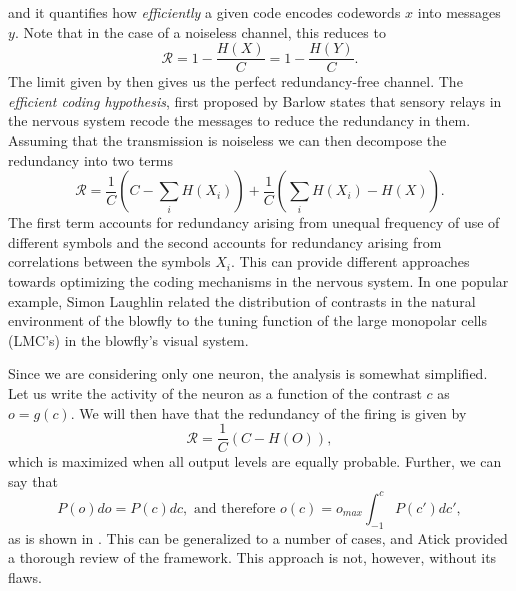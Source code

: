 and it quantifies how {\em efficiently} a given code encodes codewords $x$ into messages $y$. Note that in the case of a noiseless channel, this reduces to 
$$
\mathcal{R} = 1 - \frac{H(X)}{C}= 1 - \frac{H(Y)}{C}.
$$
The limit given by  then gives us the perfect redundancy-free channel. The {\em efficient coding hypothesis}, first proposed by Barlow\cite{Barlow1961} states that sensory relays in the nervous system recode the	messages to reduce the redundancy in them. Assuming that the transmission is noiseless we can then decompose the redundancy into two terms\cite{Atick1992}
$$
\mathcal{R} = \frac{1}{C} \left(C - \sum_i H(X_i) \right) + \frac{1}{C}\left(\sum_i H(X_i) -H(X)\right).
$$
The first term accounts for redundancy arising from unequal frequency of use of different symbols and the second accounts for redundancy arising from correlations between the symbols $X_i$. This can provide different approaches towards optimizing the coding mechanisms in the nervous system. In one popular example, Simon Laughlin related the distribution of contrasts in the natural environment of the blowfly to the tuning function of the large monopolar cells (LMC's) in the blowfly's visual system\cite{Laughlin1981}.


Since we are considering only one neuron, the analysis is somewhat simplified. Let us write the activity of the neuron as a function of the contrast $c$ as $o = g(c)$. We will then have that the redundancy of the firing is given by
$$
\mathcal{R} = \frac{1}{C} \left(C - H(O) \right),
$$
which is maximized when all output levels are equally probable. Further, we can say that
$$
P(o) do = P(c) dc, \textrm{ and therefore } o(c) = o_{max} \int_{-1}^c P(c') dc',
$$
as is shown in . This can be generalized to a number of cases, and Atick\cite{Atick1992} provided a thorough review of the framework. This approach is not, however, without its flaws.

